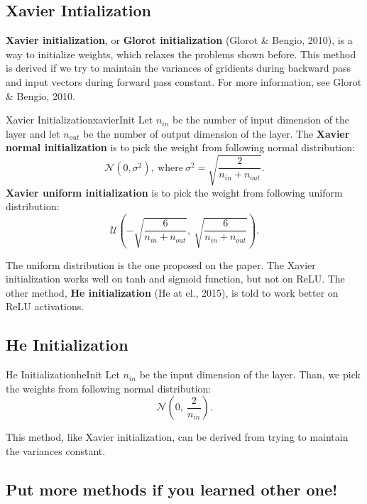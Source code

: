 \documentclass{article}
\begin{document}
    \subsection{Xavier Intialization}
        \textbf{Xavier initialization}, or \textbf{Glorot initialization} (Glorot \& Bengio, 2010), is a way to initialize weights,
        which relaxes the problems shown before. This method is derived if we try to maintain the variances of gridients during backward pass
        and input vectors during forward pass constant. For more information, see Glorot \& Bengio, 2010.
        \begin{defn}{Xavier Initialization}{xavierInit}
            Let $n_{in}$ be the number of input dimension of the layer and let $n_{out}$ be the number of output dimension of the layer.
            The \textbf{Xavier normal initialization} is to pick the weight from following normal distribution:
            \[
            \mathcal{N}(0, \sigma^2),\ \text{where}\ \sigma^2 = \sqrt{\frac{2}{n_{in}+n_{out}}}.
            \]
            \textbf{Xavier uniform initialization} is to pick the weight from following uniform distribution:
            \[
            \mathcal{U}\left(-\sqrt{\frac{6}{n_{in}+n_{out}}},\ \sqrt{\frac{6}{n_{in}+n_{out}}}\right).
            \]
        \end{defn}
        The uniform distribution is the one proposed on the paper. The Xavier initialization works well on tanh and sigmoid function, but not on
        ReLU. The other method, \textbf{He initialization} (He at el., 2015), is told to work better on ReLU activations.

    \subsection{He Initialization}
        \begin{defn}{He Initialization}{heInit}
            Let $n_{in}$ be the input dimension of the layer. Than, we pick the weights from following normal distribution:
            \[
            \mathcal{N}\left(0,\ \frac{2}{n_{in}}\right).
            \]
        \end{defn}
        This method, like Xavier initialization, can be derived from trying to maintain the variances constant.
    
    \subsection{Put more methods if you learned other one!}
\end{document}
